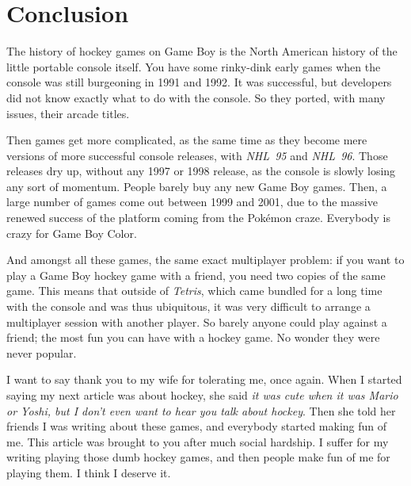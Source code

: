 \documentclass{book}
\begin{document}
\FloatBarrier\needspace{10mm}\section*{Conclusion}\nopagebreak[4]

The history of hockey games on Game Boy is the North American history of the little portable console itself. You have some rinky-dink early games when the console was still burgeoning in 1991 and 1992. It was successful, but developers did not know exactly what to do with the console. So they ported, with many issues, their arcade titles.

Then games get more complicated, as the same time as they become mere versions of more successful console releases, with \emph{NHL~95} and \emph{NHL~96}. Those releases dry up, without any 1997 or 1998 release, as the console is slowly losing any sort of momentum. People barely buy any new Game Boy games. Then, a large number of games come out between 1999 and 2001, due to the massive renewed success of the platform coming from the Pokémon craze. Everybody is crazy for Game Boy Color.

And amongst all these games, the same exact multiplayer problem: if you want to play a Game Boy hockey game with a friend, you need two copies of the same game. This means that outside of \emph{Tetris}, which came bundled for a long time with the console and was thus ubiquitous, it was very difficult to arrange a multiplayer session with another player. So barely anyone could play against a friend; the most fun you can have with a hockey game. No wonder they were never popular.

I want to say thank you to my wife for tolerating me, once again. When I started saying my next article was about hockey, she said \emph{it was cute when it was Mario or Yoshi, but I don’t even want to hear you talk about hockey}. Then she told her friends I was writing about these games, and everybody started making fun of me. This article was brought to you after much social hardship. I suffer for my writing playing those dumb hockey games, and then people make fun of me for playing them. I think I deserve it.
\end{document}
